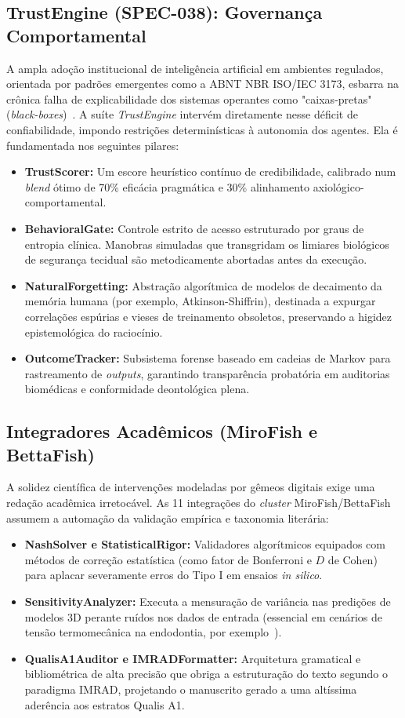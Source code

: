 \subsection{TrustEngine (SPEC-038): Governança Comportamental}
A ampla adoção institucional de inteligência artificial em ambientes regulados, orientada por padrões emergentes como a ABNT NBR ISO/IEC 3173, esbarra na crônica falha de explicabilidade dos sistemas operantes como "caixas-pretas" (\textit{black-boxes})~\cite{Nature2026}. A suíte \textit{TrustEngine} intervém diretamente nesse déficit de confiabilidade, impondo restrições determinísticas à autonomia dos agentes. Ela é fundamentada nos seguintes pilares:
\begin{itemize}
    \item \textbf{TrustScorer:} Um escore heurístico contínuo de credibilidade, calibrado num \textit{blend} ótimo de 70\% eficácia pragmática e 30\% alinhamento axiológico-comportamental.
    \item \textbf{BehavioralGate:} Controle estrito de acesso estruturado por graus de entropia clínica. Manobras simuladas que transgridam os limiares biológicos de segurança tecidual são metodicamente abortadas antes da execução.
    \item \textbf{NaturalForgetting:} Abstração algorítmica de modelos de decaimento da memória humana (por exemplo, Atkinson-Shiffrin), destinada a expurgar correlações espúrias e vieses de treinamento obsoletos, preservando a higidez epistemológica do raciocínio.
    \item \textbf{OutcomeTracker:} Subsistema forense baseado em cadeias de Markov para rastreamento de \textit{outputs}, garantindo transparência probatória em auditorias biomédicas e conformidade deontológica plena.
\end{itemize}

\subsection{Integradores Acadêmicos (MiroFish e BettaFish)}
A solidez científica de intervenções modeladas por gêmeos digitais exige uma redação acadêmica irretocável. As 11 integrações do \textit{cluster} MiroFish/BettaFish assumem a automação da validação empírica e taxonomia literária:
\begin{itemize}
    \item \textbf{NashSolver e StatisticalRigor:} Validadores algorítmicos equipados com métodos de correção estatística (como fator de Bonferroni e $D$ de Cohen) para aplacar severamente erros do Tipo I em ensaios \textit{in silico}.
    \item \textbf{SensitivityAnalyzer:} Executa a mensuração de variância nas predições de modelos 3D perante ruídos nos dados de entrada (essencial em cenários de tensão termomecânica na endodontia, por exemplo~\cite{Elsaid2025}).
    \item \textbf{QualisA1Auditor e IMRADFormatter:} Arquitetura gramatical e bibliométrica de alta precisão que obriga a estruturação do texto segundo o paradigma IMRAD, projetando o manuscrito gerado a uma altíssima aderência aos estratos Qualis A1.
\end{itemize}
